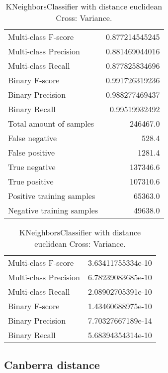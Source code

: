 \begin{table}[H]
\begin{minipage}{0.5\textwidth}
\caption{KNeighborsClassifier with distance euclidean Cross: Average.}
\centering
\begin{tabular}{l r}
\toprule
Multi-class F-score & 0.877214545245 \\
Multi-class Precision & 0.881469044016 \\
Multi-class Recall & 0.877825834696 \\
\midrule
Binary F-score & 0.991726319236 \\
Binary Precision & 0.988277469437 \\
Binary Recall & 0.99519932492 \\
\midrule
Total amount of samples & 246467.0 \\
False negative & 528.4 \\
False positive & 1281.4 \\
True negative & 137346.6 \\
True positive & 107310.6 \\
\midrule
Positive training samples & 65363.0 \\
Negative training samples & 49638.0 \\
\bottomrule
\end{tabular}
\end{minipage}
\hfillx
\begin{minipage}{0.5\textwidth}
\caption{KNeighborsClassifier with distance euclidean Cross: Variance.}
\centering
\begin{tabular}{l r}
\toprule
Multi-class F-score & 3.63411755334e-10 \\
Multi-class Precision & 6.78239083685e-10 \\
Multi-class Recall & 2.08902705391e-10 \\
\midrule
Binary F-score & 1.43460688975e-10 \\
Binary Precision & 7.70327667189e-14 \\
Binary Recall & 5.68394354314e-10 \\
\bottomrule
\end{tabular}
\end{minipage}
\end{table}

\newpage
\subsection{Canberra distance}

